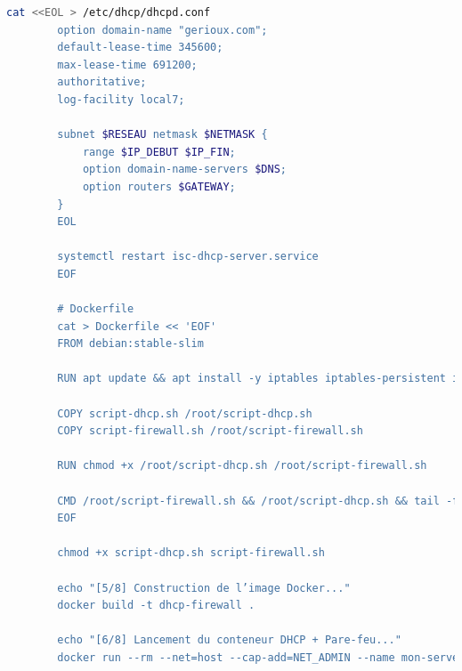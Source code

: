 \begin{lstlisting}[language=bash]
		cat <<EOL > /etc/dhcp/dhcpd.conf
		option domain-name "gerioux.com";
		default-lease-time 345600;
		max-lease-time 691200;
		authoritative;
		log-facility local7;
		
		subnet $RESEAU netmask $NETMASK {
			range $IP_DEBUT $IP_FIN;
			option domain-name-servers $DNS;
			option routers $GATEWAY;
		}
		EOL
		
		systemctl restart isc-dhcp-server.service
		EOF
		
		# Dockerfile
		cat > Dockerfile << 'EOF'
		FROM debian:stable-slim
		
		RUN apt update && apt install -y iptables iptables-persistent isc-dhcp-server net-tools nano systemctl
		
		COPY script-dhcp.sh /root/script-dhcp.sh
		COPY script-firewall.sh /root/script-firewall.sh
		
		RUN chmod +x /root/script-dhcp.sh /root/script-firewall.sh
		
		CMD /root/script-firewall.sh && /root/script-dhcp.sh && tail -f /dev/null
		EOF
		
		chmod +x script-dhcp.sh script-firewall.sh
		
		echo "[5/8] Construction de l’image Docker..."
		docker build -t dhcp-firewall .
		
		echo "[6/8] Lancement du conteneur DHCP + Pare-feu..."
		docker run --rm --net=host --cap-add=NET_ADMIN --name mon-serveur-dhcp dhcp-firewall
	\end{lstlisting}
	

